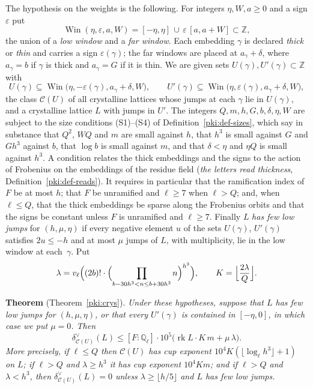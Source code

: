\documentclass[10pt]{amsart}
\theoremstyle{definition}
\theoremstyle{remark}
\begin{document}
The hypothesis on the weights is the following. For integers $\eta,W,a\ge0$ and a sign
$\varepsilon$ put
\[
\operatorname{Win}(\eta,\varepsilon,a,W)=[-\eta,\eta]\,\cup\,\varepsilon\,[a,a+W]\subset\mathbb Z ,
\]
the union of a \emph{low window} and a \emph{far window}. Each embedding $\gamma$ is declared
\emph{thick} or \emph{thin} and carries a sign $\varepsilon(\gamma)$; the far windows are placed
at $a_\gamma+\delta$, where $a_\gamma=b$ if $\gamma$ is thick and $a_\gamma=G$ if it is thin.
We are given sets $U(\gamma),U'(\gamma)\subset\mathbb Z$ with
\[
U(\gamma)\subseteq\operatorname{Win}\bigl(\eta,-\varepsilon(\gamma),a_\gamma+\delta,W\bigr),\qquad
U'(\gamma)\subseteq\operatorname{Win}\bigl(\eta,\varepsilon(\gamma),a_\gamma+\delta,W\bigr),
\]
the class $\mathcal C(U)$ of all crystalline lattices whose jumps at each $\gamma$ lie in
$U(\gamma)$, and a crystalline lattice $L$ with jumps in $U'$. The integers
$Q,m,h,G,b,\delta,\eta,W$ are subject to the size conditions (S1)--(S4) of
Definition~\ref{pki:def-sizes}, which say in substance that $Q^2$, $WQ$ and $m$ are small
against $h$, that $h^3$ is small against $G$ and $Gh^3$ against $b$, that $\log b$ is small
against $m$, and that $\delta<\eta$ and $\eta Q$ is small against $h^3$. A condition
relates the thick embeddings and the signs to the action of Frobenius on the embeddings of the
residue field (\emph{the letters read thickness}, Definition~\ref{pki:def-reads}). It requires
in particular that the ramification index of $F$ be at most $h$; that $F$ be unramified and
$\ell\ge7$ when $\ell>Q$; and, when $\ell\le Q$, that the thick embeddings be sparse along the
Frobenius orbits and that the signs be constant unless $F$ is unramified and $\ell\ge7$. Finally $L$ \emph{has few low jumps} for $(h,\mu,\eta)$ if every negative
element $u$ of the sets $U(\gamma)$, $U'(\gamma)$ satisfies $2u\le-h$ and at most $\mu$ jumps of
$L$, with multiplicity, lie in the low window at each~$\gamma$. Put
\[
\lambda=v_\ell\Bigl((2b)!\cdot\Bigl(\prod_{b-30h^3<n\le b+30h^3}n\Bigr)^{h^3}\Bigr),\qquad
K=\Bigl\lfloor\frac{2\lambda}{Q}\Bigr\rfloor .
\]

\medskip\noindent\textbf{Theorem} (Theorem~\ref{pki:crys}). \emph{Under these hypotheses,
suppose that $L$ has few low jumps for $(h,\mu,\eta)$, or that every $U'(\gamma)$ is contained in
$[-\eta,0]$, in which case we put $\mu=0$. Then
\[
\delta^\vee_{\mathcal C(U)}(L)\le[F:\mathbb Q_\ell]\cdot10^5\bigl(\operatorname{rk}L\cdot K\,m+\mu\,\lambda\bigr).
\]
More precisely, if $\ell\le Q$ then $\mathcal C(U)$ has cup exponent
$10^4K(\lfloor\log_\ell h^3\rfloor+1)$ on $L$; if $\ell>Q$ and $\lambda\ge h^3$ it has cup exponent
$10^4Km$; and if $\ell>Q$ and $\lambda<h^3$, then $\delta^\vee_{\mathcal C(U)}(L)=0$ unless
$\lambda\ge\lfloor h/5\rfloor$ and $L$ has few low jumps.}\medskip
\end{document}
